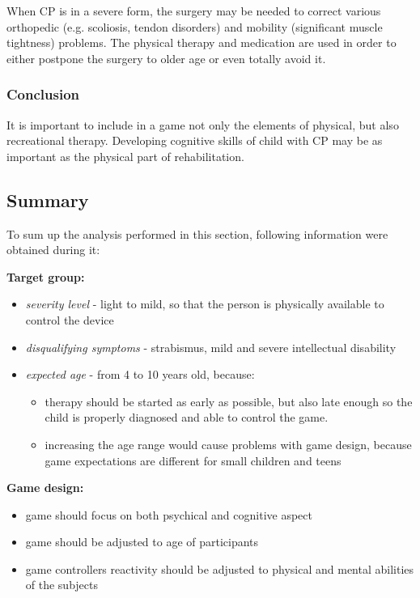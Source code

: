 When CP is in a severe form, the surgery may be needed to correct various orthopedic (e.g. scoliosis, tendon disorders) and mobility (significant muscle tightness) problems. The physical therapy and medication are used in order to either postpone the surgery to older age or even totally avoid it.

\subsubsection*{Conclusion}
It is important to include in a game not only the elements of physical, but also recreational therapy. Developing cognitive skills of child with CP may be as important as the physical part of rehabilitation.

\subsection{Summary}
To sum up the analysis performed in this section, following information were obtained during it:

\textbf{Target group:}
\begin{itemize}
\item \emph{severity level} - light to mild, so that the person is physically available to control the device
\item \emph{disqualifying symptoms} - strabismus, mild and severe intellectual disability
\item \emph{expected age} - from 4 to 10 years old, because:
\begin{itemize}
\item therapy should be started as early as possible, but also late enough so the child is properly diagnosed and able to control the game. 
\item increasing the age range would cause problems with game design, because game expectations are different for small children and teens
\end{itemize}
\end{itemize}

\textbf{Game design:}
\begin{itemize}
\item game should focus on both psychical and cognitive aspect
\item game should be adjusted to age of participants
\item game controllers reactivity should be adjusted to physical and mental abilities of the subjects
\end{itemize}